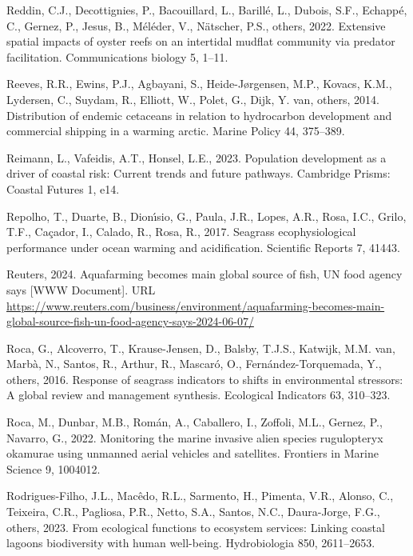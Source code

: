 \documentclass[
  letterpaper,
  11pt,
  english,
  singlespacing,
  headsepline]{MastersDoctoralThesis}
\newlength{\cslhangindent}
\newenvironment{CSLReferences}[2] %
 {\begin{list}{}{%
  \setlength{\itemindent}{0pt}
  \setlength{\leftmargin}{0pt}
  \setlength{\parsep}{0pt}
  \ifodd #1
   \setlength{\leftmargin}{\cslhangindent}
   \setlength{\itemindent}{-1\cslhangindent}
  \fi
  \setlength{\itemsep}{#2\baselineskip}}}
 {\end{list}}
\begin{document}
\begin{CSLReferences}{1}{0}
Reddin, C.J., Decottignies, P., Bacouillard, L., Barillé, L., Dubois,
S.F., Echappé, C., Gernez, P., Jesus, B., Méléder, V., Nätscher, P.S.,
others, 2022. Extensive spatial impacts of oyster reefs on an intertidal
mudflat community via predator facilitation. Communications biology 5,
1--11.

Reeves, R.R., Ewins, P.J., Agbayani, S., Heide-Jørgensen, M.P., Kovacs,
K.M., Lydersen, C., Suydam, R., Elliott, W., Polet, G., Dijk, Y. van,
others, 2014. Distribution of endemic cetaceans in relation to
hydrocarbon development and commercial shipping in a warming arctic.
Marine Policy 44, 375--389.

Reimann, L., Vafeidis, A.T., Honsel, L.E., 2023. Population development
as a driver of coastal risk: Current trends and future pathways.
Cambridge Prisms: Coastal Futures 1, e14.

Repolho, T., Duarte, B., Dionı́sio, G., Paula, J.R., Lopes, A.R., Rosa,
I.C., Grilo, T.F., Caçador, I., Calado, R., Rosa, R., 2017. Seagrass
ecophysiological performance under ocean warming and acidification.
Scientific Reports 7, 41443.

Reuters, 2024. Aquafarming becomes main global source of fish, {UN} food
agency says {[}WWW Document{]}. URL
\url{https://www.reuters.com/business/environment/aquafarming-becomes-main-global-source-fish-un-food-agency-says-2024-06-07/}

Roca, G., Alcoverro, T., Krause-Jensen, D., Balsby, T.J.S., Katwijk,
M.M. van, Marbà, N., Santos, R., Arthur, R., Mascaró, O.,
Fernández-Torquemada, Y., others, 2016. Response of seagrass indicators
to shifts in environmental stressors: A global review and management
synthesis. Ecological Indicators 63, 310--323.

Roca, M., Dunbar, M.B., Román, A., Caballero, I., Zoffoli, M.L., Gernez,
P., Navarro, G., 2022. Monitoring the marine invasive alien species
rugulopteryx okamurae using unmanned aerial vehicles and satellites.
Frontiers in Marine Science 9, 1004012.

Rodrigues-Filho, J.L., Macêdo, R.L., Sarmento, H., Pimenta, V.R.,
Alonso, C., Teixeira, C.R., Pagliosa, P.R., Netto, S.A., Santos, N.C.,
Daura-Jorge, F.G., others, 2023. From ecological functions to ecosystem
services: Linking coastal lagoons biodiversity with human well-being.
Hydrobiologia 850, 2611--2653.


\end{CSLReferences}
\end{document}
